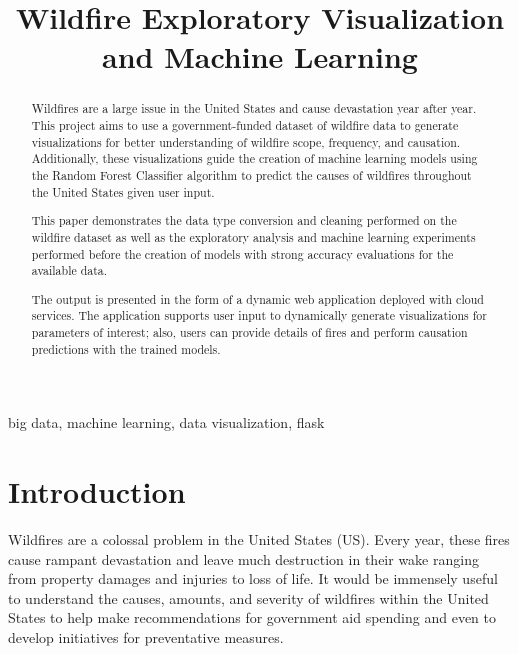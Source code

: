 \documentclass[conference]{IEEEtran}
\begin{document}
\title{Wildfire Exploratory Visualization and Machine Learning\\}

\author{
\and
{}
}

\maketitle

\begin{abstract}
    Wildfires are a large issue in the United States and cause devastation year after year. This project aims to use a government-funded dataset of wildfire data to generate visualizations for better understanding of wildfire scope, frequency, and causation. Additionally, these visualizations guide the creation of machine learning models using the Random Forest Classifier algorithm to predict the causes of wildfires throughout the United States given user input. \par
    This paper demonstrates the data type conversion and cleaning performed on the wildfire dataset as well as the exploratory analysis and machine learning experiments performed before the creation of models with strong accuracy evaluations for the available data. \par
    The output is presented in the form of a dynamic web application deployed with cloud services. The application supports user input to dynamically generate visualizations for parameters of interest; also, users can provide details of fires and perform causation predictions with the trained models.
    \linebreak
\end{abstract}

\begin{IEEEkeywords}
big data, machine learning, data visualization, flask
\end{IEEEkeywords}

\section{Introduction}
Wildfires are a colossal problem in the United States (US). Every year, these fires cause rampant devastation and leave much destruction in their wake ranging from property damages and injuries to loss of life. It would be immensely useful to understand the causes, amounts, and severity of wildfires within the United States to help make recommendations for government aid spending and even to develop initiatives for preventative measures. \par
\end{document}
